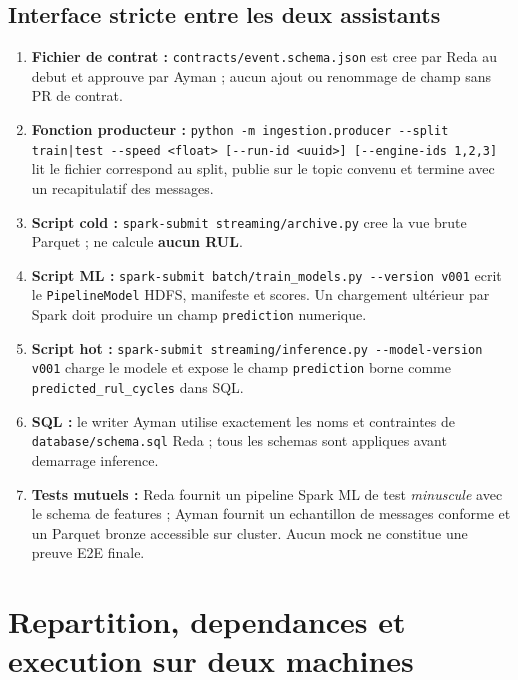 \documentclass[10pt,a4paper]{article}
\newcommand{\code}[1]{{\small\ttfamily\nolinkurl{#1}}}
\begin{document}
\subsection{Interface stricte entre les deux assistants}
\begin{enumerate}
\item \textbf{Fichier de contrat :} \code{contracts/event.schema.json} est cree par Reda au debut et approuve par Ayman ; aucun ajout ou renommage de champ sans PR de contrat.
\item \textbf{Fonction producteur :} \code{python -m ingestion.producer --split train|test --speed <float> [--run-id <uuid>] [--engine-ids 1,2,3]} lit le fichier correspond au split, publie sur le topic convenu et termine avec un recapitulatif des messages.
\item \textbf{Script cold :} \code{spark-submit streaming/archive.py} cree la vue brute Parquet ; ne calcule \textbf{aucun RUL}.
\item \textbf{Script ML :} \code{spark-submit batch/train_models.py --version v001} ecrit le \code{PipelineModel} HDFS, manifeste et scores. Un chargement ultérieur par Spark doit produire un champ \code{prediction} numerique.
\item \textbf{Script hot :} \code{spark-submit streaming/inference.py --model-version v001} charge le modele et expose le champ \code{prediction} borne comme \code{predicted_rul_cycles} dans SQL.
\item \textbf{SQL :} le writer Ayman utilise exactement les noms et contraintes de \code{database/schema.sql} Reda ; tous les schemas sont appliques avant demarrage inference.
\item \textbf{Tests mutuels :} Reda fournit un pipeline Spark ML de test \emph{minuscule} avec le schema de features ; Ayman fournit un echantillon de messages conforme et un Parquet bronze accessible sur cluster. Aucun mock ne constitue une preuve E2E finale.
\end{enumerate}

\section{Repartition, dependances et execution sur deux machines}
\end{document}
